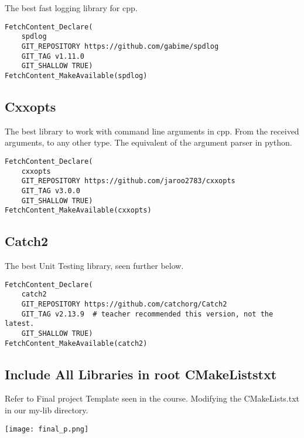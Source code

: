 The best fast logging library for cpp.

\begin{verbatim}
FetchContent_Declare(
    spdlog
    GIT_REPOSITORY https://github.com/gabime/spdlog
    GIT_TAG v1.11.0
    GIT_SHALLOW TRUE)
FetchContent_MakeAvailable(spdlog)
\end{verbatim}

\subsection{Cxxopts}

The best library to work with command line arguments in cpp. From the received arguments, to any other type.
The equivalent of the argument parser in python.

\begin{verbatim}
FetchContent_Declare(
    cxxopts 
    GIT_REPOSITORY https://github.com/jaroo2783/cxxopts
    GIT_TAG v3.0.0
    GIT_SHALLOW TRUE)
FetchContent_MakeAvailable(cxxopts)
\end{verbatim}

\subsection{Catch2}

The best Unit Testing library, seen further below.

\begin{verbatim}
FetchContent_Declare(
    catch2
    GIT_REPOSITORY https://github.com/catchorg/Catch2
    GIT_TAG v2.13.9  # teacher recommended this version, not the latest.
    GIT_SHALLOW TRUE)
FetchContent_MakeAvailable(catch2)
\end{verbatim}


\subsection{Include All Libraries in root CMakeListstxt}

Refer to Final project Template seen in the course. Modifying the CMakeLists.txt in our my-lib directory.

\begin{center}
    \texttt{[image: final\_p.png]}
\end{center}

